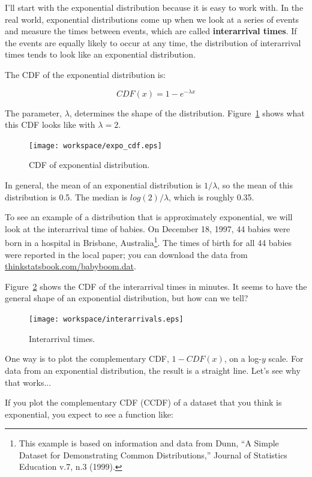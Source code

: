 \documentclass[12pt]{book}
\begin{document}
I'll start with the exponential distribution because it is
easy to work with.  In the real world, exponential distributions
come up when we look at a series of events and measure the
times between events, which are called {\bf interarrival times}.
If the events are equally likely to occur at any time, the distribution
of interarrival times tends to look like an exponential distribution.

The CDF of the exponential distribution is:

\[ CDF(x) = 1 - e^{-\lambda x} \]

The parameter, $\lambda$, determines the shape of the
distribution.  Figure~\ref{expo_cdf} shows what this CDF looks like with
$\lambda = 2$.

\begin{figure}
\centerline{\texttt{[image: workspace/expo\_cdf.eps]}}
\caption{CDF of exponential distribution.}
\label{expo_cdf}
\end{figure}

In general, the mean of an exponential distribution is $1 / \lambda$,
so the mean of this distribution is 0.5.  The median is $log(2) / \lambda$,
which is roughly 0.35.

To see an example of a distribution that is approximately exponential,
we will look at the interarrival time of babies.
On December 18, 1997, 44 babies were born in a hospital in Brisbane,
Australia\footnote{This example is based on information and data from
  Dunn, ``A Simple Dataset for Demonstrating Common Distributions,''
  Journal of Statistics Education v.7, n.3 (1999).}.  The times of
birth for all 44 babies were reported in the local paper; you can
download the data from \url{thinkstatsbook.com/babyboom.dat}.

Figure~\ref{interarrivals} shows the CDF of the interarrival times
in minutes.  It seems to have the general shape of an exponential
distribution, but how can we tell?

\begin{figure}
\centerline{\texttt{[image: workspace/interarrivals.eps]}}
\caption{Interarrival times.}
\label{interarrivals}
\end{figure}

One way is to plot the complementary CDF, $1 - CDF(x)$, on a
log-$y$ scale.  For data from an exponential distribution, the result
is a straight line.  Let's see why that works...

If you plot the complementary CDF (CCDF) of a dataset that you think is
exponential, you expect to see a function like:
\end{document}
